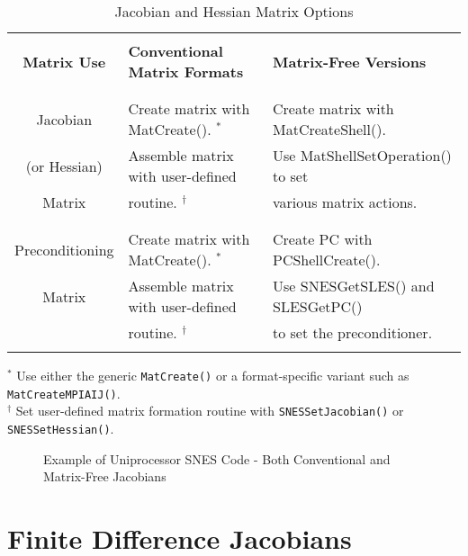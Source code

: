 \begin{center}
\begin{table}[H]
\begin{tabular}{|c|l|l|} \hline
& & \\
{\bf Matrix Use}      & {\bf Conventional Matrix Formats}          & {\bf Matrix-Free Versions}\\ 
& & \\ \hline
& & \\
Jacobian	& Create matrix with MatCreate(). $^*$ & Create matrix with MatCreateShell().\\
(or Hessian)	& Assemble matrix with user-defined	& Use MatShellSetOperation() to set\\
Matrix		& routine. $^\dagger$ 			& various matrix actions.\\
& & \\ \hline
& & \\
Preconditioning	 & Create matrix with MatCreate(). $^*$ & Create PC with PCShellCreate().\\
Matrix		 & Assemble matrix with user-defined & Use SNESGetSLES() and SLESGetPC()\\
		& routine. $^\dagger$		& to set the preconditioner.\\ 

& & \\ \hline
\end{tabular}

\medskip
$^*$ Use either the generic {\tt MatCreate()} or a format-specific variant
   such as {\tt MatCreateMPIAIJ()}.\\
$^\dagger$ Set user-defined matrix formation routine with {\tt SNESSetJacobian()} or
   {\tt SNESSetHessian()}.
\medskip
\caption{Jacobian and Hessian Matrix Options}
\label{table:jacobians}
\end{table}
\end{center}

\begin{figure}[H]
{\small
{}
}
\caption{Example of Uniprocessor SNES Code - Both Conventional and Matrix-Free Jacobians}
\label{fig:snesexample2}
\end{figure} 

\section{Finite Difference Jacobians}
\label{sec:fdmatrix}

